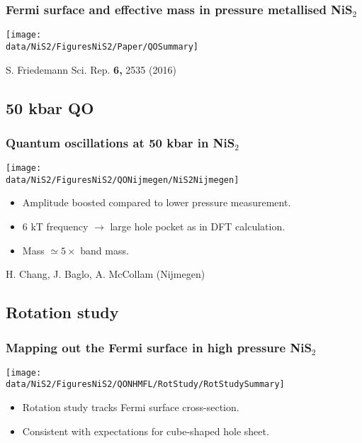 \begin{frame}[label=NiS2Mass]
  \frametitle{Fermi surface and effective mass in pressure metallised NiS$_2$}
\centerline{\texttt{[image: \\data/NiS2/FiguresNiS2/Paper/QOSummary]}}
\vspace*{\fill}
\vspace{-0.25em}
\centerline{\makebox[\linewidth]{\rule{0.85\textwidth}{0.4pt}}}
\centerline{\scriptsize S. Friedemann Sci. Rep. {\bf 6,} 2535 (2016)}
\end{frame}

\subsection{50 kbar QO}

\begin{frame}[label=QONiS2]
\frametitle{Quantum oscillations at 50 kbar in NiS$_2$}
\vspace{1em}
\centerline{\texttt{[image: \\data/NiS2/FiguresNiS2/QONijmegen/NiS2Nijmegen]}}

\begin{itemize}
\item Amplitude boosted compared to lower pressure measurement.
\item 6 kT frequency $\rightarrow$ large hole pocket as in DFT calculation. 

\item Mass $\simeq 5\times$ band mass.
\end{itemize}

\vspace*{\fill}
\centerline{\makebox[\linewidth]{\rule{0.85\textwidth}{0.4pt}}}
\centerline{\scriptsize H. Chang, J. Baglo, A. McCollam
  (Nijmegen)}
\end{frame}


\subsection{Rotation study}
\begin{frame}[label=NiS2Mass]
  \frametitle{Mapping out the Fermi surface in high pressure NiS$_2$}
\centerline{\texttt{[image: \\data/NiS2/FiguresNiS2/QONHMFL/RotStudy/RotStudySummary]}}
\begin{itemize}
\item
Rotation study tracks Fermi surface cross-section.
\item Consistent with expectations for cube-shaped hole sheet.
\end{itemize} 

\end{frame}

